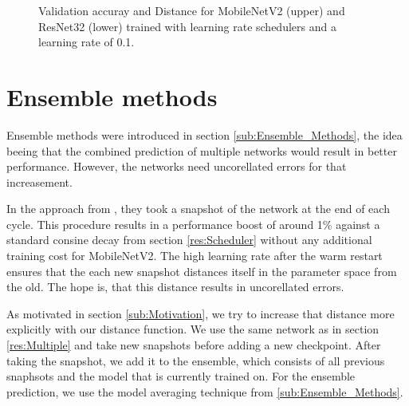 \begin{figure}[h]
\begin{center}
        \caption{Validation accuray and Distance for MobileNetV2 (upper) and ResNet32 (lower) trained with learning rate schedulers and a learning rate of 0.1.}
    \end{center}
\end{figure}



\section{Ensemble methods}\label{res:Ensemble}
Ensemble methods were introduced in section \ref{sub:Ensemble_Methods}, the idea
beeing that the combined prediction of multiple networks would result in better
performance. However, the networks need uncorellated errors for that
increasement.

In the approach from \cite{loshchilov2016sgdr}, they took a snapshot of the
network at the end of each cycle. This procedure results in a performance boost
of around 1\% against a standard consine decay from section \ref{res:Scheduler}
without any additional training cost for MobileNetV2. The high learning rate after the warm
restart ensures that the each new snapshot distances itself in the parameter
space from the old. The hope is, that this distance results in uncorellated
errors.

As motivated in section \ref{sub:Motivation}, we try to increase that distance
more explicitly with our distance function. We use the same network as in
section \ref{res:Multiple} and take new snapshots before adding a new
checkpoint. After taking the snapshot, we add it to the ensemble, which consists
of all previous snaphsots and the model that is currently trained on. For the
ensemble prediction, we use the model averaging technique from
\ref{sub:Ensemble_Methods}.


